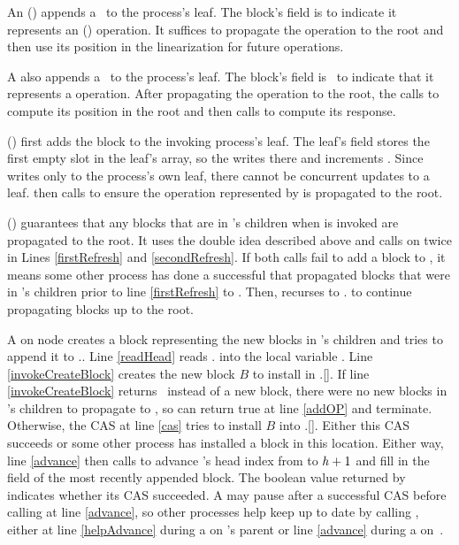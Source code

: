 An () appends a \block\ to the process's leaf.
The block's  field is  to indicate it represents an () operation.
It suffices to propagate the operation to the root and
then use its position in the linearization for future 
operations.

A  also appends a \block\ to the process's leaf.
The block's  field is \nl\ to indicate that it represents a  operation.
After propagating the operation to the root, the  calls  to compute
its position in the root 
 and then calls  to compute its response.

() first adds the block  to the invoking process's leaf.
The leaf's  field stores the first empty slot in the leaf's  array,
so the  writes  there and increments .
Since  writes only to the process's own leaf, there cannot be concurrent updates to a leaf.
 then calls  to ensure the operation represented by  is propagated to the root.

() guarantees that any blocks that are in 's children when  is invoked are propagated to the root.
It uses the double  idea described
above and calls   on  twice in Lines
\ref{firstRefresh} and \ref{secondRefresh}. 
If both calls fail to add a block to , it means some other process has done a successful 
that propagated blocks that were in 's children prior to line \ref{firstRefresh} to .
Then,  recurses to . to continue propagating blocks up to the root.  

A  on node  creates a block representing the new blocks
in 's
children and tries to append it to .. 
Line \ref{readHead} reads . into the local variable .
Line \ref{invokeCreateBlock} creates the new block $B$ to install in .[].
If line \ref{invokeCreateBlock} returns \nl\ instead of a new block, there were no new blocks in 's children to propagate to , so  can return true at line \ref{addOP} and terminate.
Otherwise, the CAS at line \ref{cas} tries to install $B$ into .[].
Either this CAS succeeds or some other process has installed a  block in this location.
Either way, line \ref{advance} then calls  to advance 's head index 
from  to $\mbox{\textnormal{\textit{h}}}+1$
and fill in the  field of the most recently appended block.
The boolean value returned by  indicates whether its CAS succeeded.
A  may pause after a successful CAS before calling  at line \ref{advance},
so other processes help keep  up to date by  calling , 
either at line \ref{helpAdvance} during a  on 's parent or line \ref{advance} during a  on~.

